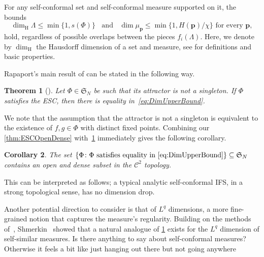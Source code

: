 \documentclass[12pt,]{article}
\def\cref#1{\ref{#1}}%
\newtheorem{theorem}{Theorem}[section]
\newtheorem{corollary}[theorem]{Corollary}
\theoremstyle{definition}
\theoremstyle{remark}
\newcommand{\0}{\mathbf{0}}
\begin{document}
For any self-conformal set and self-conformal measure supported on it, the bounds
\begin{equation}\label{eq:DimUpperBound}
\dim_{\mathrm{H}} \Lambda \leq \min\{1,s(\Phi)\}  \;\;\text{ and }\;\; \dim \mu_{\mathbf{p}} \leq
\min\{1, H(\mathbf{p})/\chi\} \text{ for every } \mathbf{p},
\end{equation} 
hold, regardless of possible overlaps between the pieces $f_i(\Lambda)$.
Here, we denote by $\dim_{\mathrm H}$ the Hausdorff dimension of a set and measure, see
\cite{FalconerBook} for definitions and basic properties.

Rapaport's main result of \cite{Rapaport_SelfConfESC25arXiv}
can be stated in the following way.

\begin{theorem}[\cite{Rapaport_SelfConfESC25arXiv}]\label{thm:RapaportMain}
  Let $\Phi\in\mathfrak{S}_N$ be such that its attractor is not a singleton. If
  $\Phi$ satisfies the ESC, then there is equality in~\cref{eq:DimUpperBound}.
\end{theorem}
We note that the assumption that the attractor is not a singleton is equivalent to the existence of
$f,g\in\Phi$ with distinct fixed points.
Combining our \cref{thm:ESCOpenDense} with~\cref{thm:RapaportMain} immediately gives the following corollary.

\begin{corollary}\label{cor:dim}
  The set $\{\Phi \colon \Phi \text{ satisfies equality in \cref{eq:DimUpperBound}}\}\subseteq
  \mathfrak{S}_N$ contains an open and dense subset in the $\mathcal{C}^2$ topology.
\end{corollary}
This can be interpreted as follows; a typical analytic self-conformal IFS, in a strong topological
sense, has no dimension drop.

Another potential direction to consider is that of $L^q$ dimensions, a more fine-grained notion that
captures the measure's regularity.  Building on the methods of~\cite{Hochman_SelfSimESC_Annals},
Shmerkin~\cite{Shmerkin_LqSelfSim_Annals} showed that a natural analogue of \cref{thm:RapaportMain}
exists for the $L^q$ dimension of self-similar measures. {\color{red} Is there anything to say about self-conformal measures? Otherwise it feels a bit like just hanging out there but not going anywhere}

\end{document}
